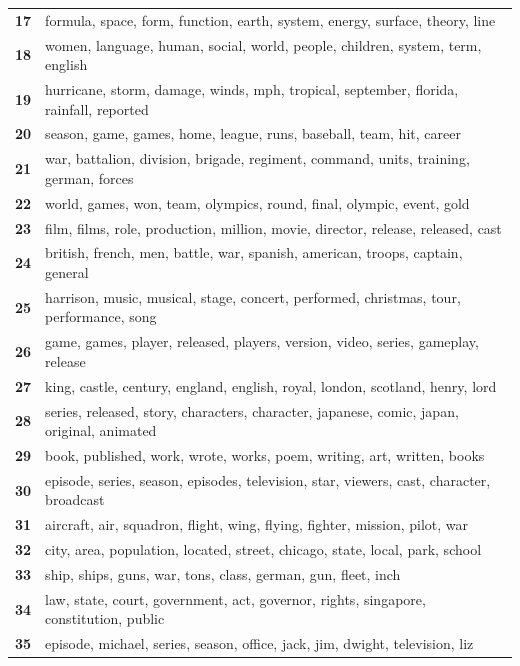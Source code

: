 \begin{table}[htpb]
\begin{tabularx}{\textwidth}{@{}l X@{}}
        \textbf{17} & formula, space, form, function, earth, system, energy, surface, theory, line \\
        \textbf{18} & women, language, human, social, world, people, children, system, term, english \\
        \textbf{19} & hurricane, storm, damage, winds, mph, tropical, september, florida, rainfall, reported \\
        \textbf{20} & season, game, games, home, league, runs, baseball, team, hit, career \\
        \textbf{21} & war, battalion, division, brigade, regiment, command, units, training, german, forces \\
        \textbf{22} & world, games, won, team, olympics, round, final, olympic, event, gold \\
        \textbf{23} & film, films, role, production, million, movie, director, release, released, cast \\
        \textbf{24} & british, french, men, battle, war, spanish, american, troops, captain, general \\
        \textbf{25} & harrison, music, musical, stage, concert, performed, christmas, tour, performance, song \\
        \textbf{26} & game, games, player, released, players, version, video, series, gameplay, release \\
        \textbf{27} & king, castle, century, england, english, royal, london, scotland, henry, lord \\
        \textbf{28} & series, released, story, characters, character, japanese, comic, japan, original, animated \\
        \textbf{29} & book, published, work, wrote, works, poem, writing, art, written, books \\
        \textbf{30} & episode, series, season, episodes, television, star, viewers, cast, character, broadcast \\
        \textbf{31} & aircraft, air, squadron, flight, wing, flying, fighter, mission, pilot, war \\
        \textbf{32} & city, area, population, located, street, chicago, state, local, park, school \\
        \textbf{33} & ship, ships, guns, war, tons, class, german, gun, fleet, inch \\
        \textbf{34} & law, state, court, government, act, governor, rights, singapore, constitution, public \\
        \textbf{35} & episode, michael, series, season, office, jack, jim, dwight, television, liz \\

\end{tabularx}
\end{table}
